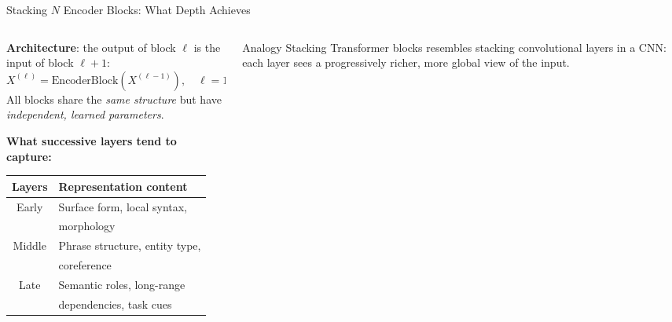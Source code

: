 \documentclass[aspectratio=169]{beamer}
\begin{document}
\begin{frame}{Stacking $N$ Encoder Blocks: What Depth Achieves}
\small
\begin{columns}[T]
\begin{column}{0.52\textwidth}

\textbf{Architecture}: the output of block $\ell$ is the input of block $\ell+1$:
\[
  X^{(\ell)} = \mathrm{EncoderBlock}\!\left(X^{(\ell-1)}\right),
  \quad \ell = 1, \ldots, N.
\]
All blocks share the \emph{same structure} but have
\emph{independent, learned parameters}.

\textbf{What successive layers tend to capture:}

\begin{tabular}{@{}cl@{}}
  \toprule
  Layers & Representation content \\
  \midrule
  Early   & Surface form, local syntax,\\
           & morphology \\[2pt]
  Middle  & Phrase structure, entity type,\\
           & coreference \\[2pt]
  Late    & Semantic roles, long-range\\
           & dependencies, task cues \\
  \bottomrule
\end{tabular}

\end{column}
\begin{column}{0.44\textwidth}

\begin{block}{Analogy}
  Stacking Transformer blocks resembles
  stacking convolutional layers in a CNN:
  each layer sees a progressively richer,
  more global view of the input.
\end{block}

\end{column}
\end{columns}

\end{frame}
\end{document}
